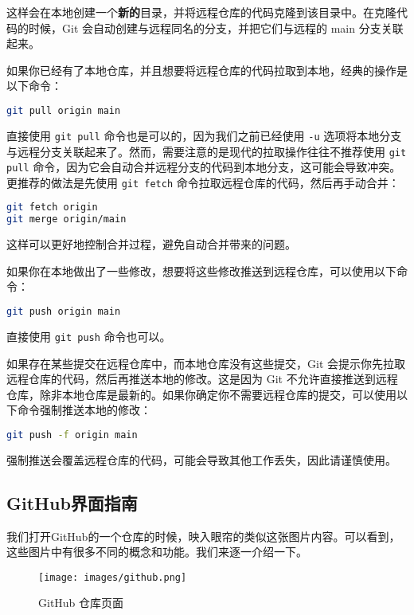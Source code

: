 \documentclass[../main.tex]{subfiles}
\begin{document}
这样会在本地创建一个\textbf{新的}目录，并将远程仓库的代码克隆到该目录中。在克隆代码的时候，Git 会自动创建与远程同名的分支，并把它们与远程的 main 分支关联起来。

如果你已经有了本地仓库，并且想要将远程仓库的代码拉取到本地，经典的操作是以下命令：
\begin{lstlisting}[language=bash]
git pull origin main
\end{lstlisting}
直接使用 \texttt{git pull} 命令也是可以的，因为我们之前已经使用 \texttt{-u} 选项将本地分支与远程分支关联起来了。然而，需要注意的是现代的拉取操作往往不推荐使用 \texttt{git pull} 命令，因为它会自动合并远程分支的代码到本地分支，这可能会导致冲突。更推荐的做法是先使用 \texttt{git fetch} 命令拉取远程仓库的代码，然后再手动合并：
\begin{lstlisting}[language=bash]
git fetch origin
git merge origin/main
\end{lstlisting}
这样可以更好地控制合并过程，避免自动合并带来的问题。

如果你在本地做出了一些修改，想要将这些修改推送到远程仓库，可以使用以下命令：
\begin{lstlisting}[language=bash]
git push origin main
\end{lstlisting}
直接使用 \texttt{git push} 命令也可以。

如果存在某些提交在远程仓库中，而本地仓库没有这些提交，Git 会提示你先拉取远程仓库的代码，然后再推送本地的修改。这是因为 Git 不允许直接推送到远程仓库，除非本地仓库是最新的。如果你确定你不需要远程仓库的提交，可以使用以下命令强制推送本地的修改：
\begin{lstlisting}[language=bash]
git push -f origin main
\end{lstlisting}

\begin{warning}
  强制推送会覆盖远程仓库的代码，可能会导致其他工作丢失，因此请谨慎使用。
\end{warning}

\subsection{GitHub界面指南}

我们打开GitHub的一个仓库的时候，映入眼帘的类似这张图片内容。可以看到，这些图片中有很多不同的概念和功能。我们来逐一介绍一下。

\begin{figure}[ht]
  \centering
  \texttt{[image: images/github.png]}
  \caption{GitHub 仓库页面}
  \label{fig:github}
\end{figure}
\end{document}
